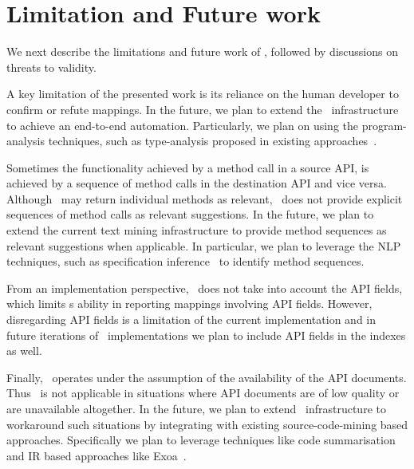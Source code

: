 \vspace*{-1.5ex}
\section{Limitation and Future work}
\label{sec:discussion}
\vspace*{-1ex}

We next describe the limitations and future work of \tool,
followed by discussions on threats to validity.


A key limitation of the presented work is its reliance on the human developer
to confirm or refute mappings.
In the future, we plan to extend the \tool\ infrastructure to achieve an end-to-end automation. 
Particularly, we plan on using the program-analysis techniques, 
such as type-analysis proposed in
existing approaches~\cite{nguyen2014statistical,zhong09SE}.



Sometimes the functionality achieved by a method call in a source API,
is achieved by a sequence of method calls in the destination API and vice versa.
Although \tool\ may return individual methods as relevant, 
\tool\ does not provide explicit sequences of method calls as relevant suggestions.
In the future, we plan to extend the current text mining infrastructure
to provide method sequences as relevant suggestions when applicable. 
In particular, we plan to leverage the NLP techniques, such as
specification inference~\cite{pandita12:inferring} to identify method sequences. 



From an implementation perspective, \tool\ does not take into account 
the API fields,
which limits \tool s ability in reporting mappings involving API fields.
However, disregarding API fields is a limitation of the current implementation 
and in future iterations of \tool\ implementations we plan to include API fields in the indexes as well.

Finally, \tool\ operates under the assumption of the availability of the API documents.
Thus \tool\ is not applicable in situations where API documents are of low quality or are unavailable altogether.
In the future, we plan to extend \tool\ infrastructure to workaround such situations
by integrating with existing source-code-mining based approaches.
Specifically we plan to leverage techniques like code summarisation~\cite{sridhara2011ICPC} and IR based approaches like Exoa~\cite{kim2010towards}.

